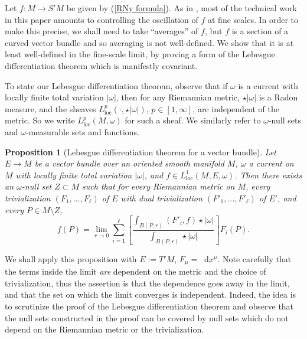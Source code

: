 \documentclass[reqno,10pt]{amsart}
\newcommand*\dif{\mathop{}\!\mathrm{d}}
\newcommand{\loc}{\mathrm{loc}}
\newtheorem{proposition}[theorem]{Proposition}
\theoremstyle{definition}
\numberwithin{equation}{section}
\begin{document}
Let $f: M \to S'M$ be given by (\ref{RNy formula}).
As in \cite{Miranda66, Giusti77}, most of the technical work in this paper amounts to controlling the oscillation of $f$ at fine scales.
In order to make this precise, we shall need to take ``averages'' of $f$, but $f$ is a section of a curved vector bundle and so averaging is not well-defined.
We show that it is at least well-defined in the fine-scale limit, by proving a form of the Lebesgue differentiation theorem which is manifestly covariant.

To state our Lebesgue differentiation theorem, observe that if $\omega$ is a current with locally finite total variation $|\omega|$, then for any Riemannian metric, $\star|\omega|$ is a Radon measure, and the sheaves $L^p_\loc(\cdot, \star |\omega|)$, $p \in [1, \infty]$, are independent of the metric.
So we write $L^p_\loc(M, \omega)$ for such a sheaf.
We similarly refer to $\omega$-null sets and $\omega$-measurable sets and functions.

\begin{proposition}[Lebesgue differentiation theorem for a vector bundle]\label{LebesgueDiff}
Let $E \to M$ be a vector bundle over an oriented smooth manifold $M$, $\omega$ a current on $M$ with locally finite total variation $|\omega|$, and $f \in L^1_\loc(M, E, \omega)$.
Then there exists an $\omega$-null set $Z \subset M$ such that for every Riemannian metric on $M$, every trivialization $(F_1, \dots, F_\ell)$ of $E$ with dual trivialization $(F'_1, \dots, F'_\ell)$ of $E'$, and every $P \in M \setminus Z$,
$$f(P) = \lim_{r \to 0} \sum_{i=1}^\ell \left[\frac{\int_{B(P, r)} (F'_i, f) \star |\omega|}{\int_{B(P, r)} \star |\omega|}\right] F_i(P).$$
\end{proposition}

We shall apply this proposition with $E := T'M$, $F_\mu = \dif x^\mu$.
Note carefully that the terms inside the limit \emph{are} dependent on the metric and the choice of trivialization, thus the assertion is that the dependence goes away in the limit, and that the set on which the limit converges is independent.
Indeed, the idea is to scrutinize the proof of the Lebesgue differentiation theorem \cite[Chapter 3, Theorem 1.3]{stein2009real} and observe that the null sets constructed in the proof can be covered by null sets which do not depend on the Riemannian metric or the trivialization.
\end{document}
